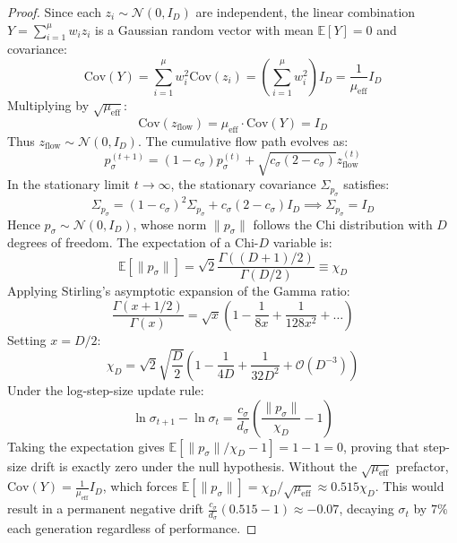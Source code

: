 \documentclass[10pt,journal,compsoc]{IEEEtran}
\begin{document}
\begin{proof}
Since each $z_i \sim \mathcal{N}(0, I_D)$ are independent, the linear combination $Y = \sum_{i=1}^\mu w_i z_i$ is a Gaussian random vector with mean $\mathbb{E}[Y] = 0$ and covariance:
\begin{equation}
\text{Cov}(Y) = \sum_{i=1}^\mu w_i^2 \text{Cov}(z_i) = \left(\sum_{i=1}^\mu w_i^2\right) I_D = \frac{1}{\mu_{\text{eff}}} I_D
\end{equation}
Multiplying by $\sqrt{\mu_{\text{eff}}}$:
\begin{equation}
\text{Cov}(z_{\text{flow}}) = \mu_{\text{eff}} \cdot \text{Cov}(Y) = I_D
\end{equation}
Thus $z_{\text{flow}} \sim \mathcal{N}(0, I_D)$. The cumulative flow path evolves as:
\begin{equation}
p_\sigma^{(t+1)} = (1 - c_\sigma) p_\sigma^{(t)} + \sqrt{c_\sigma(2 - c_\sigma)} z_{\text{flow}}^{(t)}
\end{equation}
In the stationary limit $t \to \infty$, the stationary covariance $\Sigma_{p_\sigma}$ satisfies:
\begin{equation}
\Sigma_{p_\sigma} = (1 - c_\sigma)^2 \Sigma_{p_\sigma} + c_\sigma(2 - c_\sigma) I_D \implies \Sigma_{p_\sigma} = I_D
\end{equation}
Hence $p_\sigma \sim \mathcal{N}(0, I_D)$, whose norm $\|p_\sigma\|$ follows the Chi distribution with $D$ degrees of freedom. The expectation of a Chi-$D$ variable is:
\begin{equation}
\mathbb{E}[\|p_\sigma\|] = \sqrt{2} \frac{\Gamma((D+1)/2)}{\Gamma(D/2)} \equiv \chi_D
\end{equation}
Applying Stirling's asymptotic expansion of the Gamma ratio:
\begin{equation}
\frac{\Gamma(x + 1/2)}{\Gamma(x)} = \sqrt{x} \left(1 - \frac{1}{8x} + \frac{1}{128x^2} + \dots \right)
\end{equation}
Setting $x = D/2$:
\begin{equation}
\chi_D = \sqrt{2} \sqrt{\frac{D}{2}} \left(1 - \frac{1}{4D} + \frac{1}{32D^2} + \mathcal{O}(D^{-3})\right)
\end{equation}
Under the log-step-size update rule:
\begin{equation}
\ln \sigma_{t+1} - \ln \sigma_t = \frac{c_\sigma}{d_\sigma} \left( \frac{\|p_\sigma\|}{\chi_D} - 1 \right)
\end{equation}
Taking the expectation gives $\mathbb{E}[\|p_\sigma\| / \chi_D - 1] = 1 - 1 = 0$, proving that step-size drift is exactly zero under the null hypothesis. Without the $\sqrt{\mu_{\text{eff}}}$ prefactor, $\text{Cov}(Y) = \frac{1}{\mu_{\text{eff}}} I_D$, which forces $\mathbb{E}[\|p_\sigma\|] = \chi_D / \sqrt{\mu_{\text{eff}}} \approx 0.515 \chi_D$. This would result in a permanent negative drift $\frac{c_\sigma}{d_\sigma}(0.515 - 1) \approx -0.07$, decaying $\sigma_t$ by $7\%$ each generation regardless of performance.
\end{proof}
\end{document}
